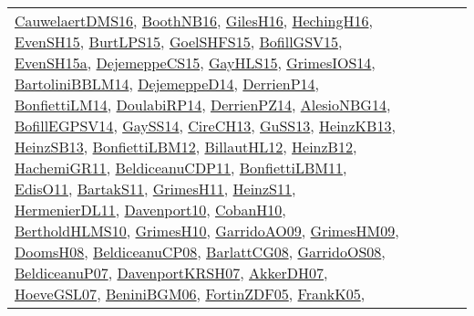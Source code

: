 {\begin{longtable}{lp{3cm}>{\raggedright}p{6cm}>{\raggedright}p{6cm}p{8cm}}
\href{papers/CauwelaertDMS16.pdf}{CauwelaertDMS16}\cite{CauwelaertDMS16}, \href{papers/BoothNB16.pdf}{BoothNB16}\cite{BoothNB16}, \href{papers/GilesH16.pdf}{GilesH16}\cite{GilesH16}, \href{papers/HechingH16.pdf}{HechingH16}\cite{HechingH16}, \href{papers/EvenSH15.pdf}{EvenSH15}\cite{EvenSH15}, \href{papers/BurtLPS15.pdf}{BurtLPS15}\cite{BurtLPS15}, \href{articles/GoelSHFS15.pdf}{GoelSHFS15}\cite{GoelSHFS15}, \href{papers/BofillGSV15.pdf}{BofillGSV15}\cite{BofillGSV15}, \href{articles/EvenSH15a.pdf}{EvenSH15a}\cite{EvenSH15a}, \href{papers/DejemeppeCS15.pdf}{DejemeppeCS15}\cite{DejemeppeCS15}, \href{papers/GayHLS15.pdf}{GayHLS15}\cite{GayHLS15}, \href{articles/GrimesIOS14.pdf}{GrimesIOS14}\cite{GrimesIOS14}, \href{papers/BartoliniBBLM14.pdf}{BartoliniBBLM14}\cite{BartoliniBBLM14}, \href{papers/DejemeppeD14.pdf}{DejemeppeD14}\cite{DejemeppeD14}, \href{papers/DerrienP14.pdf}{DerrienP14}\cite{DerrienP14}, \href{papers/BonfiettiLM14.pdf}{BonfiettiLM14}\cite{BonfiettiLM14}, \href{papers/DoulabiRP14.pdf}{DoulabiRP14}\cite{DoulabiRP14}, \href{papers/DerrienPZ14.pdf}{DerrienPZ14}\cite{DerrienPZ14}, \href{papers/AlesioNBG14.pdf}{AlesioNBG14}\cite{AlesioNBG14}, \href{papers/BofillEGPSV14.pdf}{BofillEGPSV14}\cite{BofillEGPSV14}, \href{papers/GaySS14.pdf}{GaySS14}\cite{GaySS14}, \href{papers/CireCH13.pdf}{CireCH13}\cite{CireCH13}, \href{papers/GuSS13.pdf}{GuSS13}\cite{GuSS13}, \href{papers/HeinzKB13.pdf}{HeinzKB13}\cite{HeinzKB13}, \href{articles/HeinzSB13.pdf}{HeinzSB13}\cite{HeinzSB13}, \href{papers/BonfiettiLBM12.pdf}{BonfiettiLBM12}\cite{BonfiettiLBM12}, \href{papers/BillautHL12.pdf}{BillautHL12}\cite{BillautHL12}, \href{papers/HeinzB12.pdf}{HeinzB12}\cite{HeinzB12}, \href{articles/HachemiGR11.pdf}{HachemiGR11}\cite{HachemiGR11}, \href{articles/BeldiceanuCDP11.pdf}{BeldiceanuCDP11}\cite{BeldiceanuCDP11}, \href{papers/BonfiettiLBM11.pdf}{BonfiettiLBM11}\cite{BonfiettiLBM11}, \href{papers/EdisO11.pdf}{EdisO11}\cite{EdisO11}, \href{articles/BartakS11.pdf}{BartakS11}\cite{BartakS11}, \href{papers/GrimesH11.pdf}{GrimesH11}\cite{GrimesH11}, \href{papers/HeinzS11.pdf}{HeinzS11}\cite{HeinzS11}, \href{papers/HermenierDL11.pdf}{HermenierDL11}\cite{HermenierDL11}, \href{papers/Davenport10.pdf}{Davenport10}\cite{Davenport10}, \href{papers/CobanH10.pdf}{CobanH10}\cite{CobanH10}, \href{papers/BertholdHLMS10.pdf}{BertholdHLMS10}\cite{BertholdHLMS10}, \href{papers/GrimesH10.pdf}{GrimesH10}\cite{GrimesH10}, \href{articles/GarridoAO09.pdf}{GarridoAO09}\cite{GarridoAO09}, \href{papers/GrimesHM09.pdf}{GrimesHM09}\cite{GrimesHM09}, \href{papers/DoomsH08.pdf}{DoomsH08}\cite{DoomsH08}, \href{papers/BeldiceanuCP08.pdf}{BeldiceanuCP08}\cite{BeldiceanuCP08}, \href{papers/BarlattCG08.pdf}{BarlattCG08}\cite{BarlattCG08}, \href{articles/GarridoOS08.pdf}{GarridoOS08}\cite{GarridoOS08}, \href{papers/BeldiceanuP07.pdf}{BeldiceanuP07}\cite{BeldiceanuP07}, \href{papers/DavenportKRSH07.pdf}{DavenportKRSH07}\cite{DavenportKRSH07}, \href{papers/AkkerDH07.pdf}{AkkerDH07}\cite{AkkerDH07}, \href{papers/HoeveGSL07.pdf}{HoeveGSL07}\cite{HoeveGSL07}, \href{papers/BeniniBGM06.pdf}{BeniniBGM06}\cite{BeniniBGM06}, \href{papers/FortinZDF05.pdf}{FortinZDF05}\cite{FortinZDF05}, \href{papers/FrankK05.pdf}{FrankK05}\cite{FrankK05}, 
\end{longtable}}
